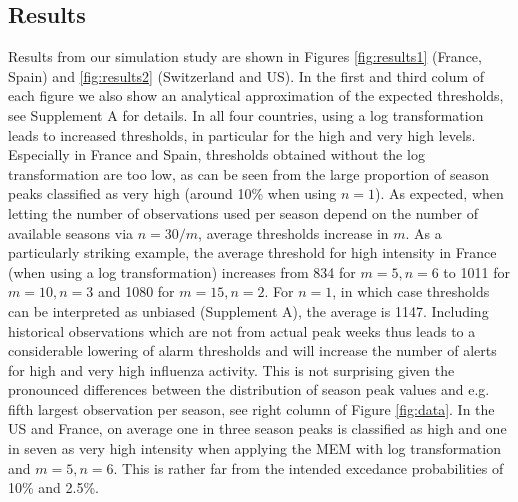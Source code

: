 \documentclass{article}
\begin{document}
\subsection{Results}

Results from our simulation study are shown in Figures \ref{fig:results1} (France, Spain) and \ref{fig:results2} (Switzerland and US). In the first and third colum of each figure we also show an analytical approximation of the expected thresholds, see Supplement A for details. In all four countries, using a log transformation leads to increased thresholds, in particular for the high and very high levels. Especially in France and Spain, thresholds obtained without the log transformation are too low, as can be seen from the large proportion of season peaks classified as very high (around 10\% when using $n = 1$). As expected, when letting the number of observations used per season depend on the number of available seasons via $n = 30/m$, average thresholds increase in $m$. As a particularly striking example, the  average threshold for high intensity in France (when using a log transformation) increases from 834 for $m = 5, n = 6$ to 1011 for $m = 10, n = 3$ and 1080 for $m = 15, n = 2$. For $n = 1$, in which case thresholds can be interpreted as unbiased (Supplement A), the average is 1147. Including historical observations which are not from actual peak weeks thus leads to a considerable lowering of alarm thresholds and will increase the number of alerts for high and very high influenza activity. This is not surprising given the pronounced differences between the distribution of season peak values and e.g. fifth largest observation per season, see right column of Figure \ref{fig:data}. In the US and France, on average one in three season peaks is classified as high and one in seven as very high intensity when applying the MEM with log transformation and $m = 5, n = 6$. This is rather far from the intended excedance probabilities of 10\% and 2.5\%.
\end{document}
